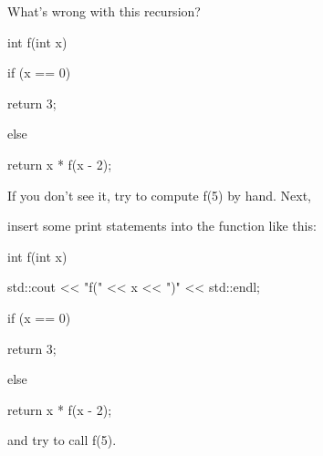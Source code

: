 What's wrong with this recursion?



\begin{consolethree}[escapeinside=||]

int f(int x)

{

    if (x == 0)

        return 3;

    else

        return x * f(x - 2);

}

\end{consolethree}



If you don't see it, try to compute f(5) by hand. Next,

insert some print statements into the function like this:



\begin{consolethree}[escapeinside=||]

int f(int x)

{

    std::cout << "f(" << x << ")" << std::endl;

    if (x == 0)

        return 3;

    else

        return x * f(x - 2);

}

\end{consolethree}



and try to call f(5).

